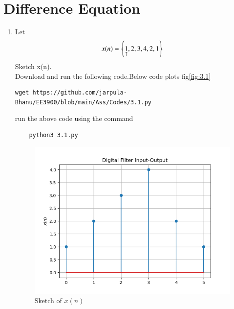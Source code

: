 \documentclass[journal,12pt,twocolumn]{IEEEtran}
\renewcommand\thesection{\arabic{section}}
\begin{document}
\section{Difference Equation}

\begin{enumerate}[label=\thesection.\arabic*
,ref=\thesection.\theenumi]
\item Let 
\begin{align}\label{3.1}
	x(n) = \left\{\underset{\uparrow}{1},2,3,4,2,1\right\}
\end{align}
Sketch x(n).\\
\solution Download and run the following code.Below code plots fig\eqref{fig:3.1}
\begin{lstlisting}
wget https://github.com/jarpula-Bhanu/EE3900/blob/main/Ass/Codes/3.1.py
\end{lstlisting}
run the above code using the command
\begin{lstlisting}
	python3 3.1.py
\end{lstlisting}
\begin{figure}[h]
    \centering
    \includegraphics[width=\columnwidth]{./figs/3.1.png}
    \caption{Sketch of $x(n)$}
    \label{fig:3.1}
\end{figure}


\end{enumerate}
\end{document}
